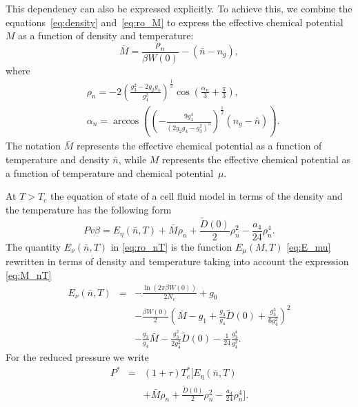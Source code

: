 This dependency can also be expressed explicitly. To achieve this, we combine the equations~\eqref{eq:density} and~\eqref{eq:ro_M} to express the effective chemical potential $M$ as a function of density and temperature:
\begin{equation}\label{eq:M_nT}
	\bar M = \frac{\rho_{n}}{\beta W(0)} - (\bar n - n_g),
\end{equation}
where
\begin{align} \label{eq:ro_nT}
	& \rho_{n} = - 2 \left(\frac{g_3^2 - 2g_2 g_4}{g_4^2} \right)^{\frac{1}{2}} \cos \left( \frac{\alpha_n}{3} + \frac{\pi}{3} \right), \\
	& \alpha_n = \arccos \left( \left( - \frac{9 g_4^4}{\left( 2 g_2 g_4 - g_3^2\right)^3}\right)^{\frac{1}{2}} (n_g - \bar n)\right). \nonumber 
\end{align}
The notation $\bar{M}$ represents the effective chemical potential as a function of temperature and density $\bar{n}$, while $M$ represents the effective chemical potential as a function of temperature and chemical potential~$\mu$.

At $T>T_c$ the equation of state of a cell fluid model in terms of the density and the temperature has the following form
\begin{equation}\label{eq:eosNT}
	Pv\beta = E_\eta (\bar n,T) + \bar M \rho_{n} + \frac{\tilde D(0)}{2} \rho_{n}^2 - \frac{a_4}{24} \rho_{n}^4.
\end{equation}
The quantity $E_\nu (\bar n, T)$ in \eqref{eq:ro_nT} is the function $E_\mu (M,T)$ \eqref{eq:E_mu} rewritten in terms of density and temperature taking into account the expression \eqref{eq:M_nT}
\begin{eqnarray}\label{eq:E_nu}
	E_\nu (\bar{n}, T) & = & - \frac{\ln (2\pi \beta W(0))}{2 N_v}  +  g_0 
	\nonumber\\
	&& - \frac{\beta W(0)}{2} 
	\left(\bar{M} - g_1 + \frac{g_3}{g_4} \tilde{D}(0) + \frac{g_3^3}{6g_4^2} \right)^{2} 
	\nonumber\\
	&& - \frac{g_3}{g_4} {\bar{M}} - \frac{g_3^2}{2 g_4^2}  \tilde D(0) - \frac{1}{24} \frac{g_3^4}{g_4^3}. 
\end{eqnarray}
For the reduced pressure we write
\begin{eqnarray}
	\label{eq:eosPTn_reduced}
	P^* & = & (1 + \tau)T^*_c \bigg[ E_\eta (\bar{n},T) 
	\nonumber\\
	&& + \bar{M} \rho_{n} + \frac{\tilde D(0)}{2} \rho_{n}^2 - \frac{a_4}{24} \rho_{n}^4\bigg].
\end{eqnarray}

